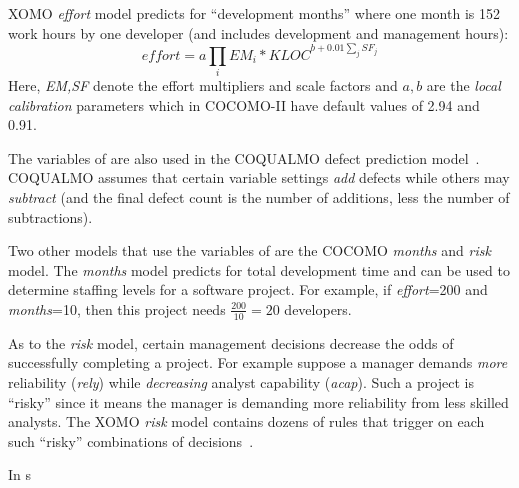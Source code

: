 XOMO {\em effort} model predicts for 
``development months'' where one month
is 152 work hours by one developer (and includes development and management hours): 
\begin{equation}\label{eq:cocII}
\mathit{effort}=a\prod_i EM_i *\mathit{KLOC}^{b+0.01\sum_j SF_j}
\end{equation}
Here, {\em EM,SF} denote the effort multipliers and scale
factors and
 $a,b$ are the {\em local calibration} parameters which in COCOMO-II
have default values of 2.94 and 0.91.

The variables of  are also  used in
the COQUALMO defect prediction
model~\cite{boehm00b}.  COQUALMO assumes that
certain variable settings {\em add} defects while
others may {\em subtract} (and the final defect count is the number of additions, less the
number of subtractions). 

Two other models that use the variables of  are the COCOMO {\em months} and {\em risk} model.
The {\em months} model predicts for total development time and   can be used to determine staffing levels
for a software project. For example, if {\em effort}=200  
and {\em months}=10, then this project needs 
$\frac{200}{10} =20$
developers.

As to the {\em risk} model, certain management decisions decrease the 
odds of successfully completing a project. For example suppose a manager demands
{\em more}  reliability ({\em rely}) while  {\em decreasing} analyst capability ({\em acap}).
Such a project is ``risky'' since it means the manager is demanding more reliability from less skilled analysts.
The XOMO {\em risk} model contains dozens of rules that trigger on each
such ``risky'' combinations of decisions~\cite{madachy97}. 

In s

